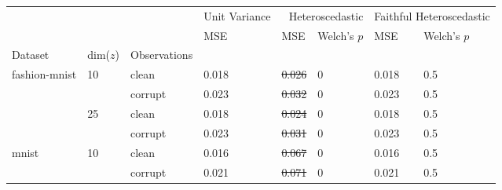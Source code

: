 \begin{tabular}{lll|l|ll|ll}
\toprule
 &  &  & Unit Variance & \multicolumn{2}{r}{Heteroscedastic} & \multicolumn{2}{r}{Faithful Heteroscedastic} \\
 &  &  & MSE & MSE & Welch's $p$ & MSE & Welch's $p$ \\
Dataset & dim($z$) & Observations &  &  &  &  &  \\
\midrule
\multirow[c]{4}{*}{fashion-mnist} & \multirow[c]{2}{*}{10} & clean & 0.018 & \sout{0.026} & 0 & 0.018 & 0.5 \\
 &  & corrupt & 0.023 & \sout{0.032} & 0 & 0.023 & 0.5 \\
 & \multirow[c]{2}{*}{25} & clean & 0.018 & \sout{0.024} & 0 & 0.018 & 0.5 \\
 &  & corrupt & 0.023 & \sout{0.031} & 0 & 0.023 & 0.5 \\
\multirow[c]{2}{*}{mnist} & \multirow[c]{2}{*}{10} & clean & 0.016 & \sout{0.067} & 0 & 0.016 & 0.5 \\
 &  & corrupt & 0.021 & \sout{0.071} & 0 & 0.021 & 0.5 \\
\bottomrule
\end{tabular}

